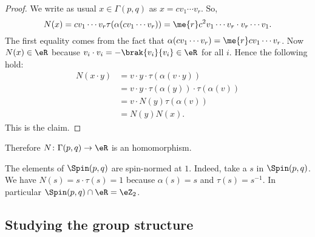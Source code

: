 \begin{proof}
We write as usual $x\in\Gamma(p,q)$ as $x=cv_1\cdots v_r$. So,
\begin{equation}
 N(x)=cv_1\cdots v_r\tau(\alpha(cv_1\cdots v_r))
     =\me{r}c^2v_1\cdots v_r\cdot v_r\cdots v_1.
\end{equation}
The first equality comes from the fact that $\alpha(cv_1\cdots v_r)=\me{r}cv_1\cdots v_r$. Now $N(x)\in\eR$ because $v_i\cdot v_i=-\brak{v_i}{v_i}\in\eR$ for all $i$. Hence the following hold:
\begin{equation}
\begin{split}
 N(x\cdot y)&=v\cdot y\cdot\tau(\alpha(v\cdot y))\\
            &=v\cdot y\cdot\tau(\alpha(y))\cdot\tau(\alpha(v))\\
            &=v\cdot N(y)\tau(\alpha(v))\\
            &=N(y)N(x).
\end{split}
\end{equation}
This is the claim.
\end{proof}

Therefore  $N\colon \Gamma(p,q)\to \eR$ is an homomorphism.

\begin{remark}
The elements of $\Spin(p,q)$ are spin-normed at $1$. Indeed, take a $s$ in $\Spin(p,q)$. We have $N(s)=s\cdot \tau(s)=1$ because $\alpha(s)=s$ and $\tau(s)=s^{-1}$. In particular $\Spin(p,q)\cap\eR=\eZ_{2}$.
\label{rem:spin_norm_u}
\end{remark}

\subsection{Studying the group structure}

